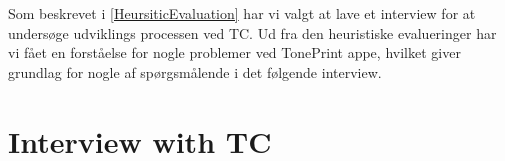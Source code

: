 Som beskrevet i \autoref{HeursiticEvaluation} har vi valgt at lave et interview for at undersøge udviklings processen ved TC. Ud fra den heuristiske evalueringer har vi fået en forståelse for nogle problemer ved TonePrint appe, hvilket giver grundlag for nogle af spørgsmålende i det følgende interview.



\section{Interview with TC}
\label{InterviewInputs}

